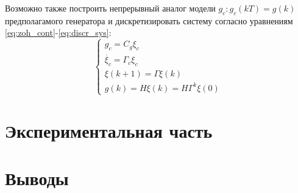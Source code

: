 \documentclass[a4paper, 14pt]{extarticle}
\theoremstyle{definition}
\theoremstyle{plain}
\theoremstyle{remark}
\begin{document}
Возможно также построить непрерывный аналог модели $g_c: g_{c}(kT) = g(k)$ предполагамого генератора и дискретизировать систему согласно уравнениям \ref{eq:zoh_cont}-\ref{eq:discr_sys}:
\begin{equation}
	\begin{cases}
		g_c = C_g \xi_c \\
		\dot{\xi_c} = \Gamma_c\xi_c\\
		\xi(k+1) = \Gamma \xi(k) \\
		g(k) = H\xi(k) = H\Gamma^k\xi(0)
	\end{cases}
\end{equation}

\section{Экспериментальная часть}

\section{Выводы}
\end{document}
